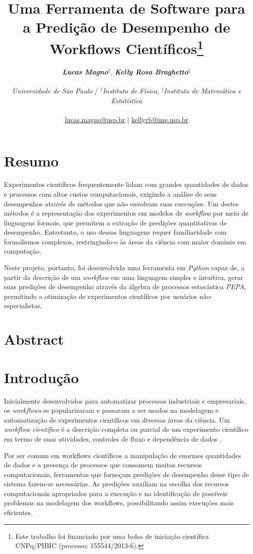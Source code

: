 \documentclass[a4paper,10pt]{article}
\date{}
\title{
    Uma Ferramenta de Software para a Predição de Desempenho de Workflows Científicos\footnote{Este trabalho foi financiado por uma bolsa de iniciação científica CNPq/PIBIC (processo: 155544/2013-6).}
}
\author{
\textbf{\textit{Lucas Magno}}$^\dagger$,\textbf{ \textit{Kelly Rosa Braghetto}}$^\ddagger$\\
\\
\textit{Universidade de São Paulo} / $^\dagger$\textit{Instituto de Física,} $^\ddagger$\textit{Instituto de Matemática e Estatística}\\
\\
\href{mailto:lucas.magno@usp.br}{lucas.magno@usp.br} | \href{mailto:kellyrb@ime.usp.br}{kellyrb@ime.usp.br}
}
\begin{document}
    \maketitle
    \section*{Resumo}
        Experimentos científicos frequentemente lidam com grandes quantidades de dados e processos com altos custos computacionais, exigindo a análise de seus desempenhos através de métodos que não envolvam suas execuções. Um destes métodos é a representação dos experimentos em modelos de \emph{workflow} por meio de linguagens formais, que permitem a extração de predições quantitativas de desempenho. Entretanto, o uso dessas linguagens requer familiaridade com formalismos complexos, restringindo-o às áreas da ciência com maior domínio em computação.

        Neste projeto, portanto, foi desenvolvida uma ferramenta em \emph{Python} capaz de, a partir da descrição de um \emph{workflow} em uma linguagem simples e intuitiva, gerar suas predições de desempenho através da álgebra de processos estocástica \emph{PEPA}, permitindo a otimização de experimentos científicos por usuários não-especialistas. 
    \section*{Abstract}

    \thispagestyle{fancy}

    \newpage
    \section*{Introdução}
        Inicialmente desenvolvidos para automatizar processos industriais e empresariais, os \emph{workflows} se popularizaram e passaram a ser usados na modelagem e automatização de experimentos científicos em diversas áreas da ciência. Um \emph{workflow científico} é a descrição completa ou parcial de um experimento científico em termo de suas atividades, controles de fluxo e dependência de dados \cite{phd:gadelha12}.

        Por ser comum em workflows científicos a manipulação de enormes quantidades de dados e a presença de processos que consomem muitos recursos computacionais, ferramentas que forneçam predições de desempenho desse tipo de sistema fazem-se necessárias. As predições auxiliam na escolha dos recursos computacionais apropriados para a execução e na identificação de possíveis problemas na modelagem dos workflows, possibilitando assim execuções mais eficientes.
\end{document}
